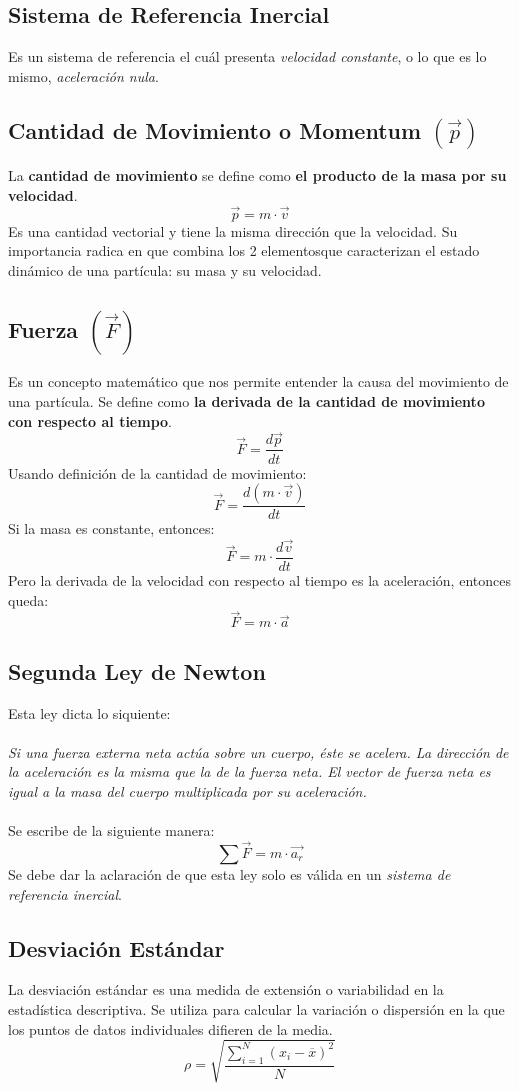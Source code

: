\documentclass[../main.tex]{subfiles}
\begin{document}
\subsection{Sistema de Referencia Inercial}
Es un sistema de referencia el cuál presenta \textit{velocidad constante}, o lo que es lo mismo, \textit{aceleración nula}.
\subsection{Cantidad de Movimiento o Momentum \( ( \vec{p} ) \)}
La \textbf{cantidad de movimiento} se define como \textbf{el producto de la masa por su velocidad}.\cite{finn}
\[ \vec{p} = m \cdot \vec{v} \]
Es una cantidad vectorial y tiene la misma dirección que la velocidad. Su importancia radica en que combina los 2 elementosque caracterizan el estado dinámico de una partícula: su masa y su velocidad.\cite{finn}
\subsection{Fuerza  \( ( \vec{F} ) \)}
Es un concepto matemático que nos permite entender la causa del movimiento de una partícula. Se define como \textbf{la derivada de la cantidad de movimiento con respecto al tiempo}.\cite{finn}
\[ \vec{F} = \frac{d \vec{p}}{dt} \]
Usando definición de la cantidad de movimiento:
\[ \vec{F} = \frac{d  (m \cdot \vec{v}) }{dt} \]
Si la masa es constante, entonces:
\[ \vec{F} = m \cdot \frac{d \vec{v} }{dt} \]
Pero la derivada de la velocidad con respecto al tiempo es la aceleración, entonces queda:
\[ \vec{F}  = m \cdot \vec{a} \]

\subsection{Segunda Ley de Newton}
Esta ley dicta lo siquiente: \\ \\
\textit{Si una fuerza externa neta actúa sobre un cuerpo, éste se acelera. La dirección de la aceleración es la misma 
que la de la fuerza neta. El vector de fuerza neta es igual a la masa del cuerpo 
multiplicada por su aceleración.} \cite{sears} \\ \\
Se escribe de la siguiente manera:
\[ \sum \vec{F}  = m \cdot \vec{a_r} \]
Se debe dar la aclaración de que esta ley solo es válida en un \textit{sistema de referencia inercial}.
\subsection{Desviación Estándar}
La desviación estándar es una medida de extensión o 
variabilidad en la estadística descriptiva. 
Se utiliza para calcular la variación o dispersión
en la que los puntos de datos individuales difieren 
de la media. 
\begin{equation} \label{desviacion_eq}
    \rho = \sqrt{\frac{\sum^N_{i=1} (x_i - \overline{x})^2}{N}}
\end{equation}
\end{document}
